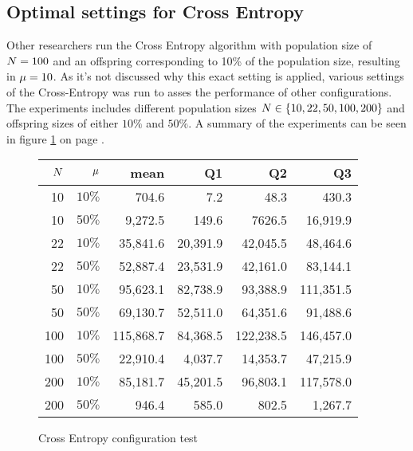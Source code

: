 \subsection{Optimal settings for Cross Entropy}

Other researchers run the Cross Entropy algorithm with population size of
$N = 100$ and an offspring corresponding to 10\% of 
the population size, resulting in $\mu = 10$. As it's not 
discussed why this exact setting is applied, various settings of the 
Cross-Entropy was run to asses the performance of other configurations.
The experiments includes different population sizes 
$N \in \{10, 22, 50, 100, 200\}$ and offspring 
sizes of either $10\%$ and $50\%$. 
A summary of the experiments can be seen in figure \ref{CEConfigTest}
on page \pageref{CEConfigTest}.

\begin{figure}[H]
\centering
\begin{tabular}{r r | r r r r}
$N$ & $\mu$ & mean & Q1 & Q2 & Q3\\
\hline
10 & $10\%$  & 704.6      & 7.2       & 48.3         & 430.3\\
10 & $50\%$  & 9,272.5    & 149.6     & 7626.5       & 16,919.9\\
22 & $10\%$  & 35,841.6   & 20,391.9  & 42,045.5     & 48,464.6\\
22 & $50\%$  & 52,887.4   & 23,531.9  & 42,161.0     & 83,144.1\\
50 & $10\%$  & 95,623.1   & 82,738.9  & 93,388.9     & 111,351.5\\
50 & $50\%$  & 69,130.7   & 52,511.0  & 64,351.6     & 91,488.6\\
\hline
100 & $10\%$ & 115,868.7  & 84,368.5  & 122,238.5    & 146,457.0\\
\hline
100 & $50\%$ & 22,910.4   & 4,037.7   & 14,353.7     & 47,215.9\\
200 & $10\%$ & 85,181.7   & 45,201.5  & 96,803.1     & 117,578.0\\
200 & $50\%$ & 946.4      & 585.0     & 802.5        & 1,267.7
\end{tabular}
\caption{Cross Entropy configuration test \label{CEConfigTest}}
\end{figure}


